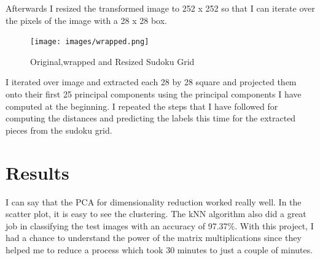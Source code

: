 Afterwards I resized the transformed image to 252 x 252 so that I can iterate
over the pixels of the image with a 28 x 28 box.

\begin{figure}[H]
    \centering
    \texttt{[image: images/wrapped.png]}
    \caption*{Original,wrapped and Resized Sudoku Grid}
    \setlength{\belowcaptionskip}{-20pt}
    \setlength{\abovecaptionskip}{-20pt}
\end{figure}

I iterated over image and extracted each 28 by 28 square and projected them onto
their first 25 principal components using the principal components I have
computed at the beginning. I repeated the steps that I have followed for
computing the distances and predicting the labels this time for the extracted
pieces from the sudoku grid.


\section*{Results}

I can say that the PCA for dimensionality reduction worked really well. In the
scatter plot, it is easy to see the clustering. The kNN algorithm also did a
great job in classifying the test images with an accuracy of 97.37\%. With this
project, I had a chance to understand the power of the matrix multiplications
since they helped me to reduce a process which took 30 minutes to just a couple
of minutes.




